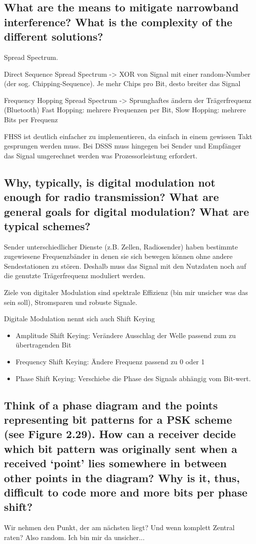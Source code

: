 \subsection{What are the means to mitigate narrowband interference? What is the complexity of
the different solutions?}
Spread Spectrum.

Direct Sequence Spread Spectrum -> XOR von Signal mit einer random-Number (der sog. Chipping-Sequence). Je mehr Chips pro Bit, desto breiter das Signal


Frequency Hopping Spread Spectrum -> Sprunghaftes ändern der Trägerfrequenz (Bluetooth)
Fast Hopping: mehrere Frequenzen per Bit, Slow Hopping: mehrere Bits per Frequenz

FHSS ist deutlich einfacher zu implementieren, da einfach in einem gewissen Takt gesprungen werden muss. Bei DSSS muss hingegen bei Sender und Empfänger das Signal umgerechnet werden was Prozessorleistung erfordert.

\subsection{Why, typically, is digital modulation not enough for radio transmission? What are
general goals for digital modulation? What are typical schemes?}
Sender unterschiedlicher Dienste (z.B. Zellen, Radiosender) haben bestimmte zugewiesene  
Frequenzbänder in denen sie sich bewegen können ohne andere Sendestationen zu stören. Deshalb muss das Signal mit den Nutzdaten noch auf die genutzte Trägerfrequenz moduliert werden.

Ziele von digitaler Modulation sind spektrale Effizienz (bin mir unsicher was das sein soll), Stromsparen und robuste Signale.

Digitale Modulation nennt sich auch Shift Keying
\begin{itemize}

\item Amplitude Shift Keying: Verändere Ausschlag der Welle passend zum zu übertragenden Bit

\item Frequency Shift Keying: Ändere Frequenz passend zu 0 oder 1

\item Phase Shift Keying: Verschiebe die Phase des Signals abhängig vom Bit-wert.

\end{itemize}

\subsection{Think of a phase diagram and the points representing bit patterns for a PSK scheme
(see Figure 2.29). How can a receiver decide which bit pattern was originally sent
when a received ‘point’ lies somewhere in between other points in the diagram? Why
is it, thus, difficult to code more and more bits per phase shift?}
Wir nehmen den Punkt, der am nächsten liegt? Und wenn komplett Zentral raten? Also random. Ich bin mir da unsicher...

